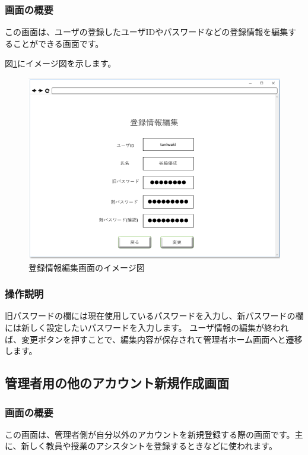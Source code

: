 \subsubsection{画面の概要}
この画面は、ユーザの登録したユーザIDやパスワードなどの登録情報を編集することができる画面です。

図\ref{fig:06}にイメージ図を示します。

\begin{figure}[htbp]
  \begin{center}
    \includegraphics[width=1\linewidth,clip]{./img/06.png}
    \caption{登録情報編集画面のイメージ図}\label{fig:06}
  \end{center}
\end{figure}

\subsubsection{操作説明}
旧パスワードの欄には現在使用しているパスワードを入力し、新パスワードの欄には新しく設定したいパスワードを入力します。
ユーザ情報の編集が終われば、変更ボタンを押すことで、編集内容が保存されて管理者ホーム画面へと遷移します。

\newpage

\subsection{管理者用の他のアカウント新規作成画面}
\subsubsection{画面の概要}
この画面は、管理者側が自分以外のアカウントを新規登録する際の画面です。主に、新しく教員や授業のアシスタントを登録するときなどに使われます。

